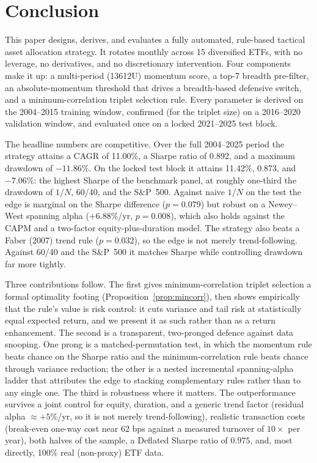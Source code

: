 \section{Conclusion}
\label{sec:conclusion}

This paper designs, derives, and evaluates a fully automated, rule-based tactical
asset allocation strategy. It rotates monthly across 15 diversified ETFs, with no
leverage, no derivatives, and no discretionary intervention. Four components make it
up: a multi-period (13612U) momentum score, a top-7 breadth pre-filter, an
absolute-momentum threshold that drives a breadth-based defensive switch, and a
minimum-correlation triplet selection rule. Every parameter is derived on the
2004--2015 training window, confirmed (for the triplet size) on a 2016--2020
validation window, and evaluated once on a locked 2021--2025 test block.

The headline numbers are competitive. Over the full 2004--2025 period the strategy
attains a CAGR of 11.00\%, a Sharpe ratio of 0.892, and a maximum drawdown of
$-11.86\%$. On the locked test block it attains 11.42\%, 0.873, and $-7.06\%$: the
highest Sharpe of the benchmark panel, at roughly one-third the drawdown of $1/N$,
60/40, and the S\&P~500. Against naive $1/N$ on the test the edge is marginal on the
Sharpe difference ($p = 0.079$) but robust on a Newey--West spanning alpha
($+6.88\%$/yr, $p = 0.008$), which also holds against the CAPM and a two-factor
equity-plus-duration model. The strategy also beats a Faber (2007) trend rule
($p = 0.032$), so the edge is not merely trend-following. Against 60/40 and the
S\&P~500 it matches Sharpe while controlling drawdown far more tightly.

Three contributions follow. The first gives minimum-correlation triplet selection a
formal optimality footing (Proposition~\ref{prop:mincorr}), then shows empirically
that the rule's value is risk control: it cuts variance and tail risk at
statistically equal expected return, and we present it as such rather than as a
return enhancement. The second is a transparent, two-pronged defence against data
snooping. One prong is a matched-permutation test, in which the momentum rule beats
chance on the Sharpe ratio and the minimum-correlation rule beats chance through
variance reduction; the other is a nested incremental spanning-alpha ladder that
attributes the edge to stacking complementary rules rather than to any single one.
The third is robustness where it matters. The outperformance survives a joint
control for equity, duration, and a generic trend factor (residual alpha
$\approx +5\%$/yr, so it is not merely trend-following), realistic transaction costs
(break-even one-way cost near $62$ bps against a measured turnover of $10\times$ per
year), both halves of the sample, a Deflated Sharpe ratio of $0.975$, and, most
directly, 100\% real (non-proxy) ETF data.

